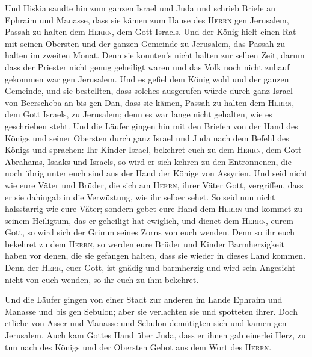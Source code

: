  Und Hiskia sandte hin zum ganzen Israel und Juda und
schrieb Briefe an Ephraim und Manasse, dass sie kämen zum Hause des
\textsc{Herrn} gen Jerusalem, Passah zu halten dem \textsc{Herrn}, dem
Gott Israels.  Und der König hielt einen Rat mit seinen
Obersten und der ganzen Gemeinde zu Jerusalem, das Passah zu halten im
zweiten Monat.  Denn sie konnten's nicht halten zur selben
Zeit, darum dass der Priester nicht genug geheiligt waren und das Volk
noch nicht zuhauf gekommen war gen Jerusalem.  Und es
gefiel dem König wohl und der ganzen Gemeinde,  und sie
bestellten, dass solches ausgerufen würde durch ganz Israel von
Beerscheba an bis gen Dan, dass sie kämen, Passah zu halten dem
\textsc{Herrn}, dem Gott Israels, zu Jerusalem; denn es war lange nicht
gehalten, wie es geschrieben steht.  Und die Läufer gingen
hin mit den Briefen von der Hand des Königs und seiner Obersten durch
ganz Israel und Juda nach dem Befehl des Königs und sprachen: Ihr Kinder
Israel, bekehret euch zu dem \textsc{Herrn}, dem Gott Abrahams, Isaaks
und Israels, so wird er sich kehren zu den Entronnenen, die noch übrig
unter euch sind aus der Hand der Könige von Assyrien.  Und
seid nicht wie eure Väter und Brüder, die sich am \textsc{Herrn}, ihrer
Väter Gott, vergriffen, dass er sie dahingab in die Verwüstung, wie ihr
selber sehet.  So seid nun nicht halsstarrig wie eure
Väter; sondern gebet eure Hand dem \textsc{Herrn} und kommet zu seinem
Heiligtum, das er geheiligt hat ewiglich, und dienet dem \textsc{Herrn},
eurem Gott, so wird sich der Grimm seines Zorns von euch wenden.
 Denn so ihr euch bekehret zu dem \textsc{Herrn}, so
werden eure Brüder und Kinder Barmherzigkeit haben vor denen, die sie
gefangen halten, dass sie wieder in dieses Land kommen. Denn der
\textsc{Herr}, euer Gott, ist gnädig und barmherzig und wird sein
Angesicht nicht von euch wenden, so ihr euch zu ihm bekehret.

 Und die Läufer gingen von einer Stadt zur anderen im
Lande Ephraim und Manasse und bis gen Sebulon; aber sie verlachten sie
und spotteten ihrer.  Doch etliche von Asser und Manasse
und Sebulon demütigten sich und kamen gen Jerusalem. 
Auch kam Gottes Hand über Juda, dass er ihnen gab einerlei Herz, zu tun
nach des Königs und der Obersten Gebot aus dem Wort des \textsc{Herrn}.

